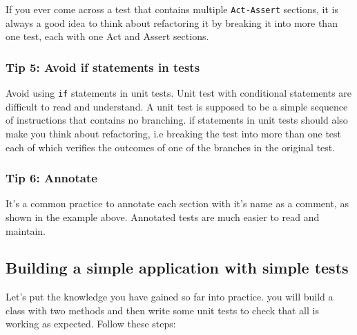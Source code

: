 \documentclass[
]{book}
\begin{document}
If you ever come across a test that contains multiple \texttt{Act-Assert} sections, it is always a good idea to think about refactoring it by breaking it into more than one test, each with one Act and Assert sections.

\hypertarget{avoidif}{%
\subsubsection{Tip 5: Avoid if statements in tests}\label{avoidif}}

Avoid using \texttt{if} statements in unit tests. Unit test with conditional statements are difficult to read and understand. A unit test is supposed to be a simple sequence of instructions that contains no branching. if statements in unit tests should also make you think about refactoring, i.e breaking the test into more than one test each of which verifies the outcomes of one of the branches in the original test.

\hypertarget{annotate}{%
\subsubsection{Tip 6: Annotate}\label{annotate}}

It's a common practice to annotate each section with it's name as a comment, as shown in the example above. Annotated tests are much easier to read and maintain.

\hypertarget{simples}{%
\subsection{Building a simple application with simple tests}\label{simples}}

Let's put the knowledge you have gained so far into practice. you will build a class with two methods and then write some unit tests to check that all is working as expected. Follow these steps:
\end{document}
